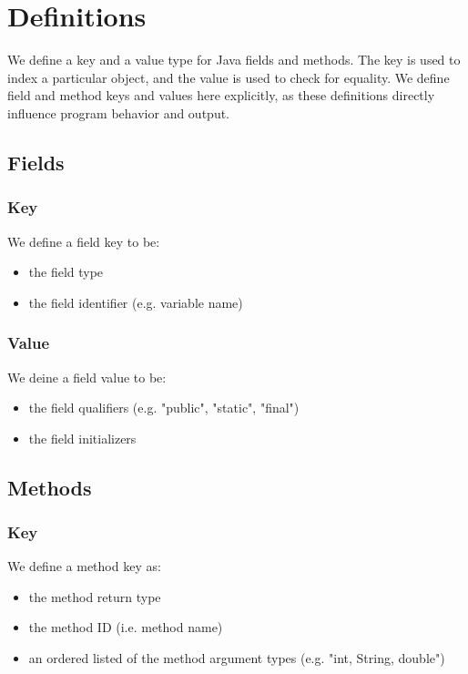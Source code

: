 \chapter{Definitions}

We define a key and a value type for Java fields and methods. The key is
used to index a particular object, and the value is used to check for
equality. We define field and method keys and values here explicitly, as these
definitions directly influence program behavior and output.

\section{Fields}

\subsection{Key}

We define a field key to be:

\begin{itemize}
    \item the field type
    \item the field identifier (e.g. variable name)
\end{itemize}

\subsection{Value}

We deine a field value to be:

\begin{itemize}
    \item the field qualifiers (e.g. "public", "static", "final")
    \item the field initializers
\end{itemize}

\section{Methods}

\subsection{Key}

We define a method key as:

\begin{itemize}
    \item the method return type
    \item the method ID (i.e. method name)
    \item an ordered listed of the method argument types (e.g. "int, String, double")
\end{itemize}

